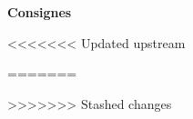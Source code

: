 

\noindent\textbf{Consignes}

<<<<<<< Updated upstream



=======



>>>>>>> Stashed changes






